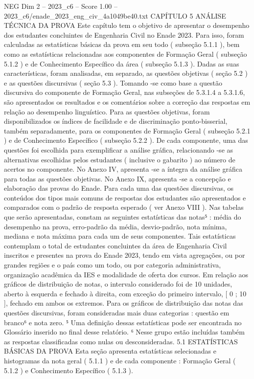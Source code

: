 \begin{textsample}{NEG Dim 2 – 2023\_c6 – Score 1.00 – 2023\_c6/enade\_2023\_eng\_civ\_4a1049be40.txt}  \label{ex:f2_neg_271}
CAPÍTULO 5 ANÁLISE TÉCNICA DA PROVA Este capítulo tem o objetivo de apresentar o desempenho dos estudantes concluintes de Engenharia Civil no Enade 2023.
Para isso, foram calculadas as estatísticas básicas da prova em seu todo ( subseção 5.1.1 ), bem como as estatísticas relacionadas aos componentes de Formação Geral ( subseção 5.1.2 ) e de Conhecimento Específico da área ( subseção 5.1.3 ).
Dadas as suas características, foram analisadas, em separado, as questões objetivas ( seção 5.2 ) e as questões discursivas ( seção 5.3 ).
Tomando -se como base a questão discursiva do componente de Formação Geral, nas subseções de 5.3.1.4 a 5.3.1.6, são apresentados os resultados e os comentários sobre a correção das respostas em relação ao desempenho linguístico.
Para as questões objetivas, foram disponibilizados os índices de facilidade e de discriminação ponto-bisserial, também separadamente, para os componentes de Formação Geral ( subseção 5.2.1 ) e de Conhecimento Específico ( subseção 5.2.2 ).
De cada componente, uma das questões foi escolhida para exemplificar a análise gráfica, relacionando -se as alternativas escolhidas pelos estudantes ( inclusive o gabarito ) ao número de acertos no componente.
No Anexo IV, apresenta -se a íntegra da análise gráfica para todas as questões objetivas.
No Anexo IX, apresenta -se a concepção e elaboração das provas do Enade.
Para cada uma das questões discursivas, os conteúdos dos tipos mais comuns de respostas dos estudantes são apresentados e comparados com o padrão de resposta esperado ( ver Anexo VIII ).
Nas tabelas que serão apresentadas, constam as seguintes estatísticas das notas⁵ : média do desempenho na prova, erro-padrão da média, desvio-padrão, nota mínima, mediana e nota máxima para cada um de seus componentes.
Tais estatísticas contemplam o total de estudantes concluintes da área de Engenharia Civil inscritos e presentes na prova do Enade 2023, tendo em vista agregações, ou por grandes regiões e o país como um todo, ou por categoria administrativa, organização acadêmica da IES e modalidade de oferta dos cursos.
Em relação aos gráficos de distribuição de notas, o intervalo considerado foi de 10 unidades, aberto à esquerda e fechado à direita, com exceção do primeiro intervalo, [ 0 ; 10 ], fechado em ambos os extremos.
Para os gráficos de distribuição das notas das questões discursivas, foram consideradas mais duas categorias : questão em branco⁶ e nota zero. ⁵ Uma definição dessas estatísticas pode ser encontrada no Glossário inserido no final desse relatório. ⁶ Nesse grupo estão incluídas também as respostas classificadas como nulas ou desconsideradas. 5.1 ESTATÍSTICAS BÁSICAS DA PROVA Esta seção apresenta estatísticas selecionadas e histogramas da nota geral ( 5.1.1 ) e de cada componente : Formação Geral ( 5.1.2 ) e Conhecimento Específico ( 5.1.3 ).

\end{textsample}
